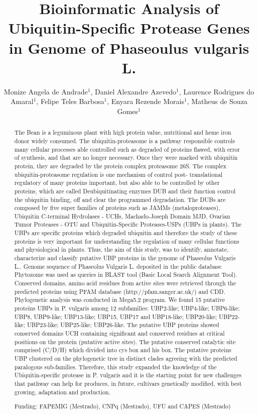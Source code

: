 \documentclass[twoside]{article}
\title{\vspace{-15mm}\fontsize{24pt}{10pt}\selectfont\textbf{Bioinformatic Analysis of Ubiquitin-Specific Protease Genes in Genome of Phaseoulus vulgaris L.}} %
\author{Monize Angela de Andrade$^1$, Daniel Alexandre Azevedo$^1$, Laurence Rodrigues do Amaral$^1$, Felipe Teles Barbosa$^1$, Enyara Rezende Morais$^1$, Matheus de Souza Gomes$^1$}
\affil{1 UFMG\\ }
\date{}
\begin{document}
\maketitle %

\thispagestyle{fancy} %


\begin{abstract}
The Bean is a leguminous plant with high protein value, nutritional and heme iron donor widely consumed. The ubiquitin-proteasome is a pathway responsible controls many cellular processes able controlled such as degraded of proteins flawed, with error of synthesis, and that are no longer necessary. Once they were marked with ubiquitin protein, they are degraded by the protein complex proteasome 26S. The complex ubiquitin-proteasome regulation is one mechanism of control post- translational regulatory of many proteins important, but also able to be controlled by other proteins, which are called Deubiquitinating enzymes DUB and their function control the ubiquitin binding, off and clear the programmed degradation. The DUBs are composed by five super families of proteins such as JAMMs (metaloproteases), Ubiquitin C-terminal Hydrolases - UCHs, Machado-Joseph Domain MJD, Ovarian Tumor Proteases - OTU and Ubiquitin-Specific Proteases-USPs (UBPs in plants). The UBPs are specific proteins which degraded ubiquitin and therefore the study of these proteins is very important for understanding the regulation of many cellular functions and physiological in plants. Thus, the aim of this study, was to identify, annotate, characterize and classify putative UBP proteins in the genome of Phaseolus Vulgaris L.. Genome sequence of Phaseolus Vulgaris L. deposited in the public database Phytozome was used as queries in BLAST tool (Basic Local Search Alignment Tool). Conserved domains, amino acid residues from active sites were retrieved through the predicted proteins using PFAM database (http://pfam.sanger.ac.uk/) and CDD. Phylogenetic analysis was conducted in Mega5.2 program. We found 15 putative proteins UBPs in P. vulgaris among 12 subfamilies: UBP2-like; UBP4-like; UBP6-like; UBP8, UBP9-like; UBP13-like; UBP15, UBP17 and UBP18-like; UBP20-like; UBP22-like; UBP23-like; UBP25-like; UBP26-like. The putative UBP proteins showed conserved domains UCH containing significant and conserved residues at critical positions on the protein (putative active sites). The putative conserved catalytic site comprised (C/D/H) which divided into cys box and his box. The putative proteins UBP clustered on the phylogenetic tree in distinct clades agreeing with the predicted paralogous sub-families. Therefore, this study expanded the knowledge of the Ubiquitin-specific protease in P. vulgaris and it is the starting point for new challenges that pathway can help for produces, in future, cultivars genetically modified, with best growing, adaptation and production.

Funding: FAPEMIG (Mestrado), CNPq (Mestrado), UFU and CAPES (Mestrado)
\end{abstract}
\end{document}
